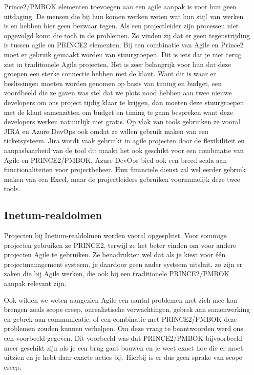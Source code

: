 \documentclass[dutch]{hogent-article}
\begin{document}
Prince2/PMBOK elementen toevoegen aan een agile aanpak is voor hun geen uitdaging. De mensen die bij hun komen werken weten wat hun stijl van werken is en hebben hier geen bezwaar tegen.
Als een projectleider zijn processen niet opgevolgd komt die toch in de problemen. Zo vinden zij dat er geen tegenstrijding is tussen agile en PRINCE2 elementen.
\newline
Bij een combinatie van Agile en Prince2 moet er gebruik gemaakt worden van stuurgroepen. Dit is iets dat je niet
terug ziet in traditionele Agile projecten. Het is zeer belangrijk voor hun dat deze groepen een sterke connectie hebben met de klant.
Want dit is waar er beslissingen moeten worden genomen op basis van timing en budget, een voordbeeld die ze gaven was stel dat we 
plots nood hebben aan twee nieuwe developers om ons project tijdig klaar te krijgen, dan moeten deze stuurgroepen met
de klant samenzitten om budget en timing te gaan bespreken want deze developers werken natuurlijk niet gratis.
\newline
Op vlak van tools gebruiken ze vooral JIRA en Azure DevOps ook omdat ze willen gebruik maken van een ticketsysteem.
Jira wordt vaak gebruikt in agile projecten door de flexibiliteit en aanpasbaarheid van de tool dit maakt het ook geschikt voor een combinatie van Agile en PRINCE2/PMBOK.
Azure DevOps bied ook een breed scala aan functionaliteiten voor projectbeheer.
Hun financiele dienst zal wel eerder gebruik maken van een Excel, maar de projectleiders gebruiken voornamelijk deze twee tools.


\subsection{Inetum-realdolmen}
\label{ssec:interview-Inetum-realdolmen}
Projecten bij Inetum-realdolmen worden vooral opgesplitst. Voor sommige projecten gebruiken ze PRINCE2, terwijl ze het beter vinden om voor andere projecten Agile te gebruiken. Ze benadrukten wel dat als je kiest voor één projectmanagement systeem, je daardoor geen ander systeem uitsluit, zo zijn er zaken die bij Agile werken, die ook bij een traditionele PRINCE2/PMBOK aanpak relevant zijn. 
\newline

Ook wilden we weten aangezien Agile een aantal problemen met zich mee kan brengen zoals scope creep, onrealistische verwachtingen, gebrek aan samenwerking en gebrek aan communicatie, of een combinatie met PRINCE2/PMBOK deze problemen zouden kunnen verhelpen. Om deze vraag te beantwoorden werd ons een voorbeeld gegeven. Dit voorbeeld was dat PRINCE2/PMBOK bijvoorbeeld meer geschikt zijn als je een brug gaat bouwen en je weet exact hoe die er moet uitzien en je hebt daar exacte acties bij. Hierbij is er dus geen sprake van scope creep. 
\newline
\end{document}
